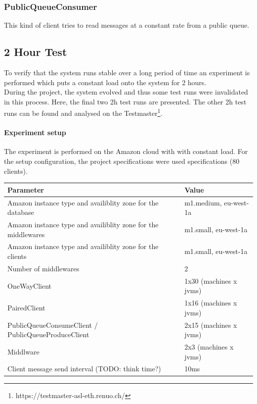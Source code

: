 \documentclass[milestone1.tex]{subfiles}
\begin{document}
\subsubsection{PublicQueueConsumer}
This kind of client tries to read messages at a constant rate from a public queue.

\subsection{2 Hour Test}



To verify that the system runs stable over a long period of time an experiment is performed which puts a constant load onto the system for 2 hours.\\

During the project, the system evolved and thus some test runs were invalidated in this process. Here, the final two 2h test runs are presented. The other 2h test runs can be found and analysed on the Testmaster\footnote{https://testmaster-asl-eth.renuo.ch/}.\\

\paragraph{Experiment setup}
The experiment is performed on the Amazon cloud with with constant load. For the setup configuration, the project specifications were used specifications (80 clients).\\

\begin{tabular}{|l|l|}
\hline 
Parameter & Value \\
\hline 
Amazon instance type and availiblity zone for the database & m1.medium, eu-west-1a \\ 
Amazon instance type and availiblity zone for the middlewares & m1.small, eu-west-1a \\ 
Amazon instance type and availiblity zone for the clients & m1.small, eu-west-1a \\ 
Number of middlewares & 2 \\ 
OneWayClient & 1x30 (machines x jvms) \\ 
PairedClient & 1x16 (machines x jvms) \\ 
PublicQueueConsumeClient / PublicQueueProduceClient & 2x15 (machines x jvms) \\
Middlware & 2x3 (machines x jvms) \\ 
Client message send interval (TODO: think time?) & 10ms \\
\hline 
\end{tabular}
\end{document}
